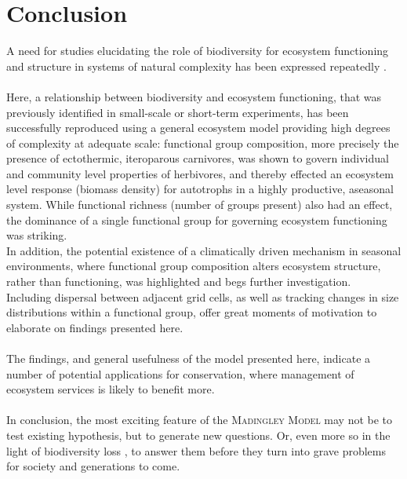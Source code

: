 \chapter{Conclusion}
A need for studies elucidating the role of biodiversity for ecosystem functioning and structure in systems of natural complexity has been expressed repeatedly \citep[e.g.][]{Hooper2012,Naeem2012,Tilman2014}.\\\\
Here, a relationship between biodiversity and ecosystem functioning, that was previously identified in small-scale or short-term experiments, has been successfully reproduced using a general ecosystem model providing high degrees of complexity at adequate scale:
functional group composition, more precisely the presence of ectothermic, iteroparous carnivores, was shown to govern individual and community level  properties of herbivores, and thereby effected an ecosystem level response (biomass density) for autotrophs in a highly productive, aseasonal system. While functional richness (number of groups present) also had an effect, the dominance of a single functional group for governing ecosystem functioning was striking.  \\
In addition, the potential existence of a climatically driven mechanism in seasonal environments, where functional group composition alters ecosystem structure, rather than functioning, 
was highlighted and begs further investigation.\\
Including dispersal between adjacent grid cells, as well as tracking changes in size distributions within a functional group, offer great moments of motivation to elaborate on findings presented here. 
\\\\
The findings, and general usefulness of the model presented here, indicate a number of potential applications for conservation, where management of ecosystem services is likely to benefit more.
\\\\
In conclusion, the most exciting feature of the \textsc{Madingley Model} may not be to test existing hypothesis, but to generate new questions. Or, even more so in the light of biodiversity loss \citep{Ceballos2015, Urban2015}, to answer them before they turn into grave problems for society and generations to come. 
